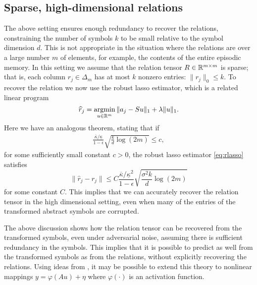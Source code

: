   \subsection{Sparse, high-dimensional relations}

 The above setting ensures enough redundancy to recover the relations, constraining the number of symbols $k$ to be small relative to the symbol dimension $d$. This is not appropriate in the situation where the relations are over a large number $m$ of elements, for example, the contents of the entire episodic memory.
 In this setting we assume that the relation tensor $R \in \mathbb{R}^{m\times m}$ is sparse; that is,
 each column $r_j \in \Delta_m$ has at most $k$ nonzero entries: $\|r_j\|_0 \leq k$. To recover the relation
 we now use the robust lasso estimator, which is a related linear program
\begin{equation}
  \hat r_j = \argmin_{u \in\reals^m} \| a_j - S u\|_1 + \lambda\|u\|_1. \label{eq:rlasso}
\end{equation}
Here we have an analogous theorem, stating that if
\begin{eqnarray}
  \frac{\overline{\kappa}/\underline{\kappa}}{1-\epsilon}\sqrt{\frac{k}{d}\log(2m)}\leq c,
\end{eqnarray}
for some sufficiently small constant $c>0$, the robust lasso estimator \eqref{eq:rlasso} satisfies
\begin{equation}
  \|\hat r_j - r_j\| \leq C \frac{\overline{\kappa}/\underline{\kappa}^2}{1-\epsilon} \sqrt{\frac{\sigma^2 k}{d} \log(2m)}
\end{equation}
for some constant $C$.
This implies that we can accurately recover the relation tensor in the high dimensional setting, even when many of the entries of the transformed abstract symbols are corrupted.


The above discussion shows how the relation tensor can be recovered from the transformed symbols, even under adversarial noise, assuming there is sufficient redundancy in the symbols. This implies that it is possible to predict as well from the transformed symbols as from the relations, without explicitly recovering the relations.
Using ideas from \citep{surfing,HandV17}, it may be possible to extend this theory to nonlinear mappings
$y = \varphi(Au) + \eta$ where $\varphi(\cdot)$ is an activation function.

